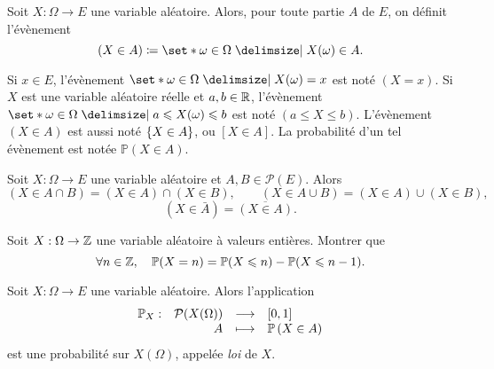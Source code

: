 \documentclass{magnolia}
\begin{document}
\begin{definition}
Soit $X:\Omega\to E$ une variable aléatoire. Alors, pour toute partie $A$ de $E$, on définit
l'évènement
\[(X\in A)\defeq\enstq{\omega\in\Omega}{X(\omega)\in A}.\] 
\end{definition}

\begin{remarques}
\remarque Si $x\in E$, l'évènement $\enstq{\omega\in\Omega}{X(\omega)=x}$ est noté
  $(X=x)$.
\remarque Si $X$ est une variable aléatoire réelle et $a,b\in\mathbb{R}$, l'évènement
  $\enstq{\omega\in\Omega}{a\leq X(\omega)\leq b}$ est noté $(a\leq X\leq b)$. 
\remarque L'évènement $(X\in A)$ est aussi noté $\left\{X\in A\right\}$, ou $[X\in A]$. La probabilité
  d'un tel évènement est notée $\mathbb{P}(X\in A)$.
\end{remarques}

\begin{proposition}
Soit $X:\Omega\to E$ une variable aléatoire et $A,B\in\mathcal{P}(E)$. Alors
\[(X\in A\cap B)=(X\in A)\cap(X\in B), \qquad (X\in A\cup B)=(X\in A)\cup(X\in B),\]
\[(X\in \bar{A})=\overline{(X\in A)}.\]
\end{proposition}

\begin{exoUnique}
\exo Soit $X:\Omega\to\mathbb{Z}$ une variable aléatoire à valeurs entières. Montrer que
  \[\forall n\in\mathbb{Z},\quad \mathbb{P}(X=n)=\mathbb{P}(X\leqslant n) - \mathbb{P}(X\leqslant n-1).\]
\end{exoUnique}


\begin{definition}
Soit $X:\Omega\to E$ une variable aléatoire. Alors l'application
\[\begin{array}[t]{lrcl} \displaystyle{\mathbb{P}_X} : & \displaystyle{\mathcal{P}(X(\Omega))} & \longrightarrow & \displaystyle{\left[0,1\right]} \\ & \displaystyle{A} & \longmapsto & \displaystyle{\mathbb{P}\left(X\in A\right)} \end{array}\]
est une probabilité sur $X(\Omega)$, appelée \emph{loi} de $X$.
\end{definition}
\end{document}
